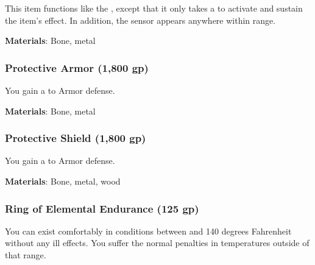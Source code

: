 This item functions like the , except that it only takes a  to activate and sustain the item's effect.
In addition, the sensor appears anywhere within \rngmed range.



\vspace{0.25em}
\textbf{Materials}: Bone, metal


\lowercase{\hypertarget{item:Protective Armor}{}}\label{item:Protective Armor}
\hypertarget{item:Protective Armor}{\subsubsection{Protective Armor\hfill{} (1,800 gp)}}

You gain a   to Armor defense.



\vspace{0.25em}
\textbf{Materials}: Bone, metal


\lowercase{\hypertarget{item:Protective Shield}{}}\label{item:Protective Shield}
\hypertarget{item:Protective Shield}{\subsubsection{Protective Shield\hfill{} (1,800 gp)}}

You gain a   to Armor defense.



\vspace{0.25em}
\textbf{Materials}: Bone, metal, wood


\lowercase{\hypertarget{item:Ring of Elemental Endurance}{}}\label{item:Ring of Elemental Endurance}
\hypertarget{item:Ring of Elemental Endurance}{\subsubsection{Ring of Elemental Endurance\hfill{} (125 gp)}}

You can exist comfortably in conditions between  and 140 degrees Fahrenheit without any ill effects.
You suffer the normal penalties in temperatures outside of that range.



